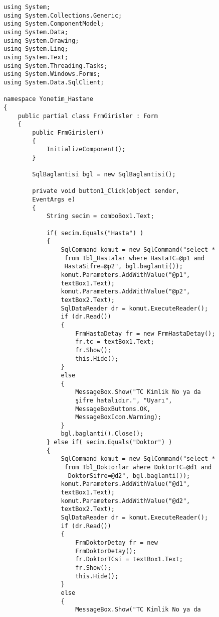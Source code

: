 \begin{lstlisting}
using System;
using System.Collections.Generic;
using System.ComponentModel;
using System.Data;
using System.Drawing;
using System.Linq;
using System.Text;
using System.Threading.Tasks;
using System.Windows.Forms;
using System.Data.SqlClient;

namespace Yonetim_Hastane
{
    public partial class FrmGirisler : Form
    {
        public FrmGirisler()
        {
            InitializeComponent();
        }

        SqlBaglantisi bgl = new SqlBaglantisi();

        private void button1_Click(object sender, 
        EventArgs e)
        {
            String secim = comboBox1.Text;

            if( secim.Equals("Hasta") )
            {
                SqlCommand komut = new SqlCommand("select *
                 from Tbl_Hastalar where HastaTC=@p1 and 
                 HastaSifre=@p2", bgl.baglanti());
                komut.Parameters.AddWithValue("@p1", 
                textBox1.Text);
                komut.Parameters.AddWithValue("@p2", 
                textBox2.Text);
                SqlDataReader dr = komut.ExecuteReader();
                if (dr.Read())
                {
                    FrmHastaDetay fr = new FrmHastaDetay();
                    fr.tc = textBox1.Text;
                    fr.Show();
                    this.Hide();
                }
                else
                {
                    MessageBox.Show("TC Kimlik No ya da 
                    şifre hatalıdır.", "Uyarı", 
                    MessageBoxButtons.OK, 
                    MessageBoxIcon.Warning);
                }
                bgl.baglanti().Close();
            } else if( secim.Equals("Doktor") )
            {
                SqlCommand komut = new SqlCommand("select *
                 from Tbl_Doktorlar where DoktorTC=@d1 and
                  DoktorSifre=@d2", bgl.baglanti());
                komut.Parameters.AddWithValue("@d1", 
                textBox1.Text);
                komut.Parameters.AddWithValue("@d2", 
                textBox2.Text);
                SqlDataReader dr = komut.ExecuteReader();
                if (dr.Read())
                {
                    FrmDoktorDetay fr = new 
                    FrmDoktorDetay();
                    fr.DoktorTCsi = textBox1.Text;
                    fr.Show();
                    this.Hide();
                }
                else
                {
                    MessageBox.Show("TC Kimlik No ya da 

\end{lstlisting}
